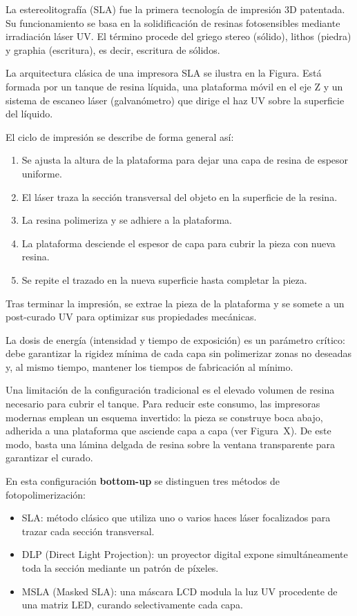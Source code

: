 La estereolitografía (SLA) fue la primera tecnología de impresión 3D patentada. Su funcionamiento se basa en la solidificación de resinas fotosensibles mediante irradiación láser UV. El término procede del griego stereo (sólido), lithos (piedra) y graphia (escritura), es decir, escritura de sólidos.

La arquitectura clásica de una impresora SLA se ilustra en la Figura. Está formada por un tanque de resina líquida, una plataforma móvil en el eje Z y un sistema de escaneo láser (galvanómetro) que dirige el haz UV sobre la superficie del líquido.

El ciclo de impresión se describe de forma general así:
\begin{enumerate}
	\item Se ajusta la altura de la plataforma para dejar una capa de resina de espesor uniforme.
	\item El láser traza la sección transversal del objeto en la superficie de la resina.
	\item La resina polimeriza y se adhiere a la plataforma.
	\item La plataforma desciende el espesor de capa para cubrir la pieza con nueva resina.
	\item Se repite el trazado en la nueva superficie hasta completar la pieza.
\end{enumerate}

Tras terminar la impresión, se extrae la pieza de la plataforma y se somete a un post-curado UV para optimizar sus propiedades mecánicas.

La dosis de energía (intensidad y tiempo de exposición) es un parámetro crítico: debe garantizar la rigidez mínima de cada capa sin polimerizar zonas no deseadas y, al mismo tiempo, mantener los tiempos de fabricación al mínimo.

Una limitación de la configuración tradicional es el elevado volumen de resina necesario para cubrir el tanque. Para reducir este consumo, las impresoras modernas emplean un esquema invertido: la pieza se construye boca abajo, adherida a una plataforma que asciende capa a capa (ver Figura~X). De este modo, basta una lámina delgada de resina sobre la ventana transparente para garantizar el curado.

En esta configuración \textbf{bottom-up} se distinguen tres métodos de fotopolimerización:

\begin{itemize}
	\item SLA: método clásico que utiliza uno o varios haces láser focalizados para trazar cada sección transversal.
	\item DLP (Direct Light Projection): un proyector digital expone simultáneamente toda la sección mediante un patrón de píxeles.
	\item MSLA (Masked SLA): una máscara LCD modula la luz UV procedente de una matriz LED, curando selectivamente cada capa.
\end{itemize}

